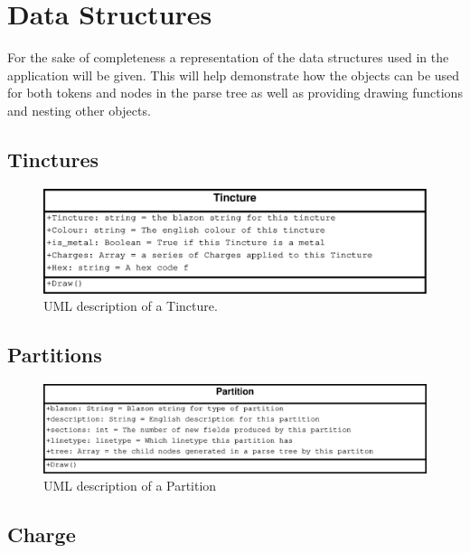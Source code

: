 \chapter{Data Structures}


For the sake of completeness a representation of the data structures used in the application will be given.  This will help demonstrate how the objects can be used for both tokens and nodes in the parse tree as well as providing drawing functions and nesting other objects.


\section{Tinctures}



\begin{figure}[H]
  \centering
    \includegraphics[width=\textwidth]{datastructures/images/tincture.eps}
  \caption{UML description of a Tincture.\cite{linetypes}}
  \label{fig:lines}
  
\end{figure}


\section{Partitions}



\begin{figure}[H]
  \centering
    \includegraphics[width=\textwidth]{datastructures/images/partition.eps}
  \caption{UML description of a Partition\cite{linetypes}}
  \label{fig:lines}
  
\end{figure}


\section{Charge}



